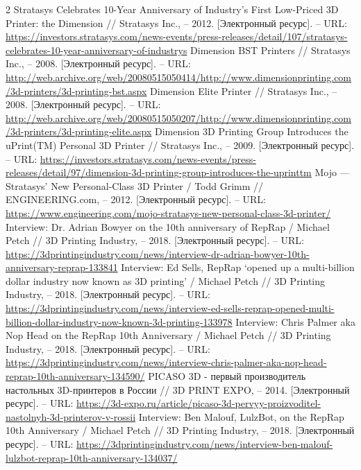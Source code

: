 \documentclass{article}
\begin{document}
\begin{thebibliography}{2}
 Stratasys Celebrates 10-Year Anniversary of Industry’s First Low-Priced 3D Printer: the Dimension // Stratasys Inc., – 2012. [Электронный ресурс]. – URL: \url{https://investors.stratasys.com/news-events/press-releases/detail/107/stratasys-celebrates-10-year-anniversary-of-industrys}
 Dimension BST Printers // Stratasys Inc., – 2008. [Электронный ресурс]. – URL: \url{http://web.archive.org/web/20080515050414/http://www.dimensionprinting.com/3d-printers/3d-printing-bst.aspx}
 Dimension Elite Printer // Stratasys Inc., – 2008. [Электронный ресурс]. – URL: \url{http://web.archive.org/web/20080515050207/http://www.dimensionprinting.com/3d-printers/3d-printing-elite.aspx}
 Dimension 3D Printing Group Introduces the uPrint(TM) Personal 3D Printer // Stratasys Inc., – 2009. [Электронный ресурс]. – URL: \url{https://investors.stratasys.com/news-events/press-releases/detail/97/dimension-3d-printing-group-introduces-the-uprinttm}
 Mojo — Stratasys’ New Personal-Class 3D Printer / Todd Grimm // ENGINEERING.com, – 2012. [Электронный ресурс]. – URL: \url{https://www.engineering.com/mojo-stratasys-new-personal-class-3d-printer/}
 Interview: Dr. Adrian Bowyer on the 10th anniversary of RepRap / Michael Petch // 3D Printing Industry, – 2018. [Электронный ресурс]. – URL: \url{https://3dprintingindustry.com/news/interview-dr-adrian-bowyer-10th-anniversary-reprap-133841}
 Interview: Ed Sells, RepRap ‘opened up a multi-billion dollar industry now known as 3D printing’ / Michael Petch // 3D Printing Industry, – 2018. [Электронный ресурс]. – URL: \url{https://3dprintingindustry.com/news/interview-ed-sells-reprap-opened-multi-billion-dollar-industry-now-known-3d-printing-133978}
 Interview: Chris Palmer aka Nop Head on the RepRap 10th Anniversary / Michael Petch // 3D Printing Industry, – 2018. [Электронный ресурс]. – URL: \url{https://3dprintingindustry.com/news/interview-chris-palmer-aka-nop-head-reprap-10th-anniversary-134590/}
 PICASO 3D - первый производитель настольных 3D-принтеров в России // 3D PRINT EXPO, – 2014. [Электронный ресурс]. – URL: \url{https://3d-expo.ru/article/picaso-3d-pervyy-proizvoditel-nastolnyh-3d-printerov-v-rossii}
 Interview: Ben Malouf, LulzBot, on the RepRap 10th Anniversary / Michael Petch // 3D Printing Industry, – 2018. [Электронный ресурс]. – URL: \url{https://3dprintingindustry.com/news/interview-ben-malouf-lulzbot-reprap-10th-anniversary-134037/}

\end{thebibliography}
\end{document}

